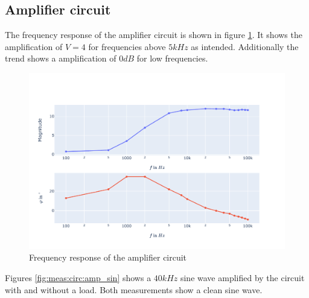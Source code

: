 \subsection{Amplifier circuit}

The frequency response of the amplifier circuit is shown in figure \ref{fig:meas:circ:amp_bode}. It shows the amplification of $V=4$ for frequencies above $5kHz$ as intended. Additionally the trend shows a amplification of $0dB$ for low frequencies.\p
%
\begin{figure}
  \centering
  \includegraphics[height=\largeheight]{src/assets/pictures/measurements/amp_bode.pdf}
  \caption{Frequency response of the amplifier circuit}\label{fig:meas:circ:amp_bode}
\end{figure}
%
Figures \ref{fig:meas:circ:amp_sin} shows a $40kHz$ sine wave amplified by the circuit with and without a load. Both measurements show a clean sine wave.
%
